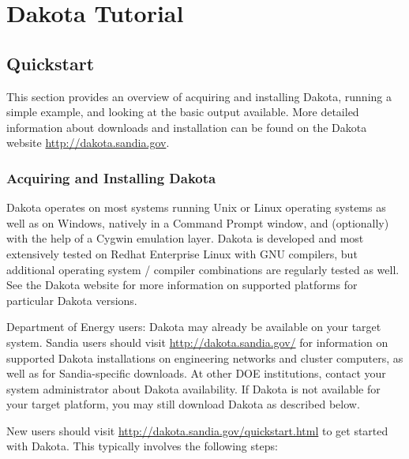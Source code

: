 \chapter{Dakota Tutorial}\label{tutorial}

\section {Quickstart}\label{tutorial:installation:quickstart}

This section provides an overview of acquiring and installing Dakota, 
running a simple example, and looking at the basic output available. 
More detailed information about downloads and installation can be found 
on the Dakota website \url{http://dakota.sandia.gov}.

\subsection {Acquiring and Installing Dakota}\label{tutorial:quickstart:installation}

Dakota operates on most systems running Unix or Linux operating
systems as well as on Windows, natively in a Command Prompt window,
and (optionally) with the help of a Cygwin emulation layer. Dakota is
developed and most extensively tested on Redhat Enterprise Linux with
GNU compilers, but additional operating system / compiler combinations
are regularly tested as well. See the Dakota website for more
information on supported platforms for particular Dakota versions.

Department of Energy users: Dakota may already be available on your
target system. Sandia users should visit
\url{http://dakota.sandia.gov/} for information on supported Dakota
installations on engineering networks and cluster computers, as well
as for Sandia-specific downloads. At other DOE institutions, contact
your system administrator about Dakota availability. If Dakota is not
available for your target platform, you may still download Dakota as
described below.

New users should visit \url{http://dakota.sandia.gov/quickstart.html} to
get started with Dakota. This typically involves the following steps:

